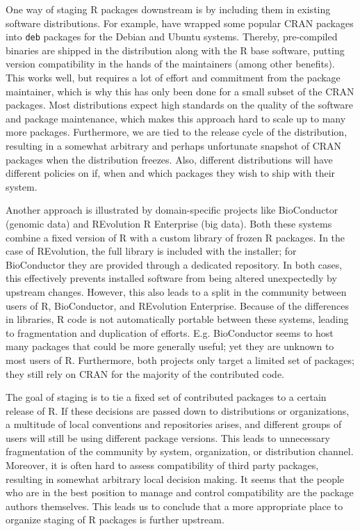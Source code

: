 One way of staging R packages downstream is by including them in existing
software distributions. For example, \citet{cran2deb} have wrapped some popular
CRAN packages into \texttt{deb} packages for the Debian and Ubuntu systems.
Thereby, pre-compiled binaries are shipped in the distribution along with the R
base software, putting version compatibility in the hands of the maintainers
(among other benefits).
This works well, but requires a lot of effort and commitment from the package
maintainer, which is why this has only been done for a small subset of the CRAN
packages. Most distributions expect high standards on the quality of the
software and package maintenance, which makes this approach hard to scale up to
many more packages. Furthermore, we are tied to the release cycle of the
distribution, resulting in a somewhat arbitrary and perhaps unfortunate
snapshot of CRAN packages when the distribution freezes. Also, different
distributions will have different policies on if, when and which packages they
wish to ship with their system.

Another approach is illustrated by domain-specific projects like BioConductor
(genomic data) and REvolution R Enterprise (big data). Both these systems
combine a fixed version of R with a custom library of frozen R packages. In
the case of REvolution, the full library is included with the installer; for
BioConductor they are provided through a dedicated repository. In both cases,
this effectively prevents installed software from being altered unexpectedly by
upstream changes. However, this also leads to a split in the community between
users of R, BioConductor, and REvolution Enterprise. Because of the differences
in libraries, R code is not automatically portable between these systems,
leading to fragmentation and duplication of efforts. E.g. BioConductor seems to
host many packages that could be more generally useful; yet they are unknown to
most users of R. Furthermore, both projects only target a limited set of
packages; they still rely on CRAN for the majority of the contributed code.

The goal of staging is to tie a fixed set of contributed packages to a certain
release of R. If these decisions are passed down to distributions or organizations, 
a multitude of local conventions and repositories arises, and different
groups of users will still be using different package versions. This leads to
unnecessary fragmentation of the community by system, organization, or distribution
channel. Moreover, it is often hard to assess compatibility of third party packages, 
resulting in somewhat arbitrary local decision making. It seems that the people who
are in the best position to manage and control compatibility are the package authors
themselves. This leads us to conclude that a more appropriate place to organize staging
of R packages is further upstream.


